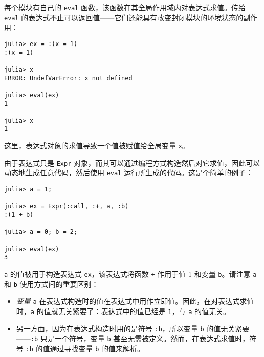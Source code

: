 每个\hyperlink{16725527896995457152}{模块}有自己的 \hyperlink{7507639810592563424}{\texttt{eval}} 函数，该函数在其全局作用域内对表达式求值。传给 \hyperlink{7507639810592563424}{\texttt{eval}} 的表达式不止可以返回值——它们还能具有改变封闭模块的环境状态的副作用：




\begin{verbatim}
julia> ex = :(x = 1)
:(x = 1)

julia> x
ERROR: UndefVarError: x not defined

julia> eval(ex)
1

julia> x
1
\end{verbatim}



这里，表达式对象的求值导致一个值被赋值给全局变量 \texttt{x}。



由于表达式只是 \texttt{Expr} 对象，而其可以通过编程方式构造然后对它求值，因此可以动态地生成任意代码，然后使用 \hyperlink{7507639810592563424}{\texttt{eval}} 运行所生成的代码。这是个简单的例子：




\begin{verbatim}
julia> a = 1;

julia> ex = Expr(:call, :+, a, :b)
:(1 + b)

julia> a = 0; b = 2;

julia> eval(ex)
3
\end{verbatim}



\texttt{a} 的值被用于构造表达式 \texttt{ex}，该表达式将函数 \texttt{+} 作用于值 1 和变量 \texttt{b}。请注意 \texttt{a} 和 \texttt{b} 使用方式间的重要区别：



\begin{itemize}
\item \emph{变量} \texttt{a} 在表达式构造时的值在表达式中用作立即值。因此，在对表达式求值时，\texttt{a} 的值就无关紧要了：表达式中的值已经是 \texttt{1}，与 \texttt{a} 的值无关。


\item 另一方面，因为在表达式构造时用的是符号 \texttt{:b}，所以变量 \texttt{b} 的值无关紧要——\texttt{:b} 只是一个符号，变量 \texttt{b} 甚至无需被定义。然而，在表达式求值时，符号 \texttt{:b} 的值通过寻找变量 \texttt{b} 的值来解析。

\end{itemize}


\hypertarget{2578517908282982662}{}


